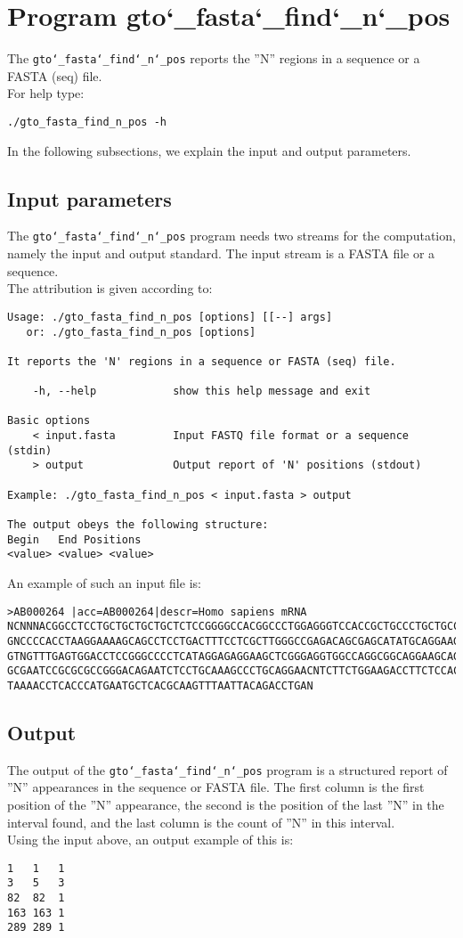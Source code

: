 \section{Program gto\char`_fasta\char`_find\char`_n\char`_pos}
The \texttt{gto\char`_fasta\char`_find\char`_n\char`_pos} reports the ''N'' regions in a sequence or a FASTA (seq) file.\\
For help type:
\begin{lstlisting}
./gto_fasta_find_n_pos -h
\end{lstlisting}
In the following subsections, we explain the input and output parameters.

\subsection*{Input parameters}

The \texttt{gto\char`_fasta\char`_find\char`_n\char`_pos} program needs two streams for the computation, namely the input and output standard. The input stream is a FASTA file or a sequence.\\
The attribution is given according to:
\begin{lstlisting}
Usage: ./gto_fasta_find_n_pos [options] [[--] args]
   or: ./gto_fasta_find_n_pos [options]

It reports the 'N' regions in a sequence or FASTA (seq) file.

    -h, --help            show this help message and exit

Basic options
    < input.fasta         Input FASTQ file format or a sequence (stdin)
    > output              Output report of 'N' positions (stdout)

Example: ./gto_fasta_find_n_pos < input.fasta > output

The output obeys the following structure:
Begin	End	Positions
<value>	<value>	<value>
\end{lstlisting}
An example of such an input file is:
\begin{lstlisting}
>AB000264 |acc=AB000264|descr=Homo sapiens mRNA 
NCNNNACGGCCTCCTGCTGCTGCTGCTCTCCGGGGCCACGGCCCTGGAGGGTCCACCGCTGCCCTGCTGCCATTGTCCCC
GNCCCCACCTAAGGAAAAGCAGCCTCCTGACTTTCCTCGCTTGGGCCGAGACAGCGAGCATATGCAGGAAGCGGCAGGAA
GTNGTTTGAGTGGACCTCCGGGCCCCTCATAGGAGAGGAAGCTCGGGAGGTGGCCAGGCGGCAGGAAGCAGGCCAGTGCC
GCGAATCCGCGCGCCGGGACAGAATCTCCTGCAAAGCCCTGCAGGAACNTCTTCTGGAAGACCTTCTCCACCCCCCCAGC
TAAAACCTCACCCATGAATGCTCACGCAAGTTTAATTACAGACCTGAN
\end{lstlisting}

\subsection*{Output}
The output of the \texttt{gto\char`_fasta\char`_find\char`_n\char`_pos} program is a structured report of ''N'' appearances in the sequence or FASTA file. The first column is the first position of the ''N'' appearance, the second is the position of the last ''N'' in the interval found, and the last column is the count of ''N'' in this interval. \\
Using the input above, an output example of this is:
\begin{lstlisting}
1	1	1
3	5	3
82	82	1
163	163	1
289	289	1
\end{lstlisting}
